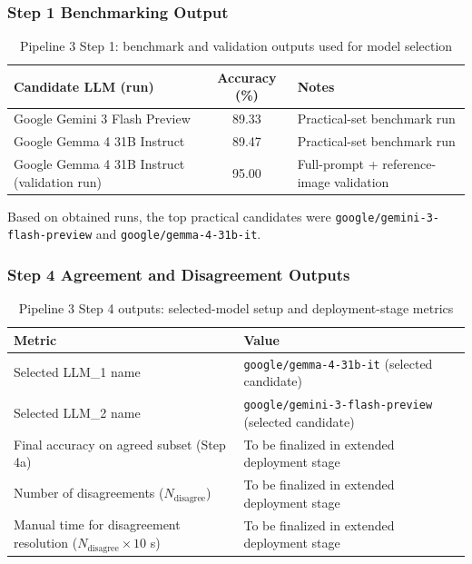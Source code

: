 \documentclass[12pt,a4paper]{article}
\begin{document}
\subsubsection{Step 1 Benchmarking Output}

\begin{table}[H]
\centering
\small
\begin{tabularx}{\textwidth}{>{\raggedright\arraybackslash}X c >{\raggedright\arraybackslash}X}
\toprule
Candidate LLM (run) & Accuracy (\%) & Notes \\
\midrule
Google Gemini 3 Flash Preview & 89.33 & Practical-set benchmark run \\
Google Gemma 4 31B Instruct & 89.47 & Practical-set benchmark run \\
Google Gemma 4 31B Instruct (validation run) & 95.00 & Full-prompt + reference-image validation \\
\bottomrule
\end{tabularx}
\caption{Pipeline 3 Step 1: benchmark and validation outputs used for model selection}
\end{table}

\noindent Based on obtained runs, the top practical candidates were \texttt{google/gemini-3-flash-preview} and \texttt{google/gemma-4-31b-it}.

\subsubsection{Step 4 Agreement and Disagreement Outputs}

\begin{table}[H]
\centering
\begin{tabularx}{\textwidth}{>{\raggedright\arraybackslash}X >{\raggedright\arraybackslash}X}
\toprule
Metric & Value \\
\midrule
Selected LLM\_1 name & \texttt{google/gemma-4-31b-it} (selected candidate) \\
Selected LLM\_2 name & \texttt{google/gemini-3-flash-preview} (selected candidate) \\
Final accuracy on agreed subset (Step 4a) & To be finalized in extended deployment stage \\
Number of disagreements ($N_{\text{disagree}}$) & To be finalized in extended deployment stage \\
Manual time for disagreement resolution ($N_{\text{disagree}} \times 10$ s) & To be finalized in extended deployment stage \\
\bottomrule
\end{tabularx}
\caption{Pipeline 3 Step 4 outputs: selected-model setup and deployment-stage metrics}
\end{table}
\end{document}
